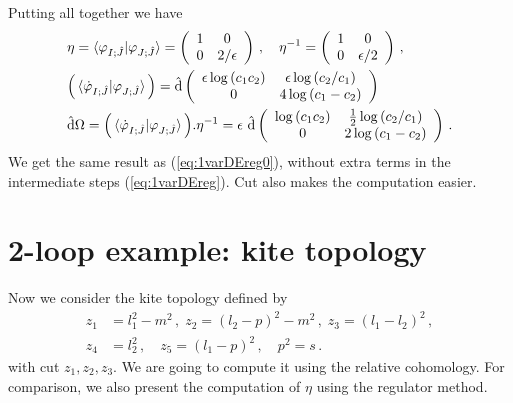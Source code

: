 \documentclass[a4paper,11pt]{article}
\newcommand{\nn}{\nonumber}
\newcommand{\nds}{\hat{\mathrm{d}}}
\newcommand{\ep}{\epsilon}
\def\eref#1{(\ref{#1})}
\begin{document}
Putting all together we have  
\begin{align}
&\eta=\braket{ \varphi_{I;\hat{J}}|\varphi_{J;\hat{J}}} =\left(
\begin{array}{cc}
 1 & 0 \\
 0 & 2/\epsilon  \\
\end{array}
\right)  \, , \quad  \eta^{-1}=\left(
\begin{array}{cc}
 1  & 0 \\
 0 & \epsilon/2 \\
\end{array}
\right)  \, , \nn\\
&\Big( \braket{\dot{\varphi}_{I;\hat{J}}|\varphi_{J;\hat{J}}} \Big) = \nds \left(
\begin{array}{cc}
\ep \log \left(c_1 c_2\right) 
& \ep \log \left(c_2/c_1\right) \\
0 
& 4 \log
   \left(c_1-c_2\right) \\
\end{array}
\right)  \, \nn\\
&\nds \Omega =\Big( \braket{\dot{\varphi}_{I;\hat{J}}|\varphi_{J;\hat{J}}} \Big).\eta^{-1}= \ep~  \nds \left(
\begin{array}{cc}
 \log \left(c_1 c_2\right) & \frac{1}{2} \log \left(c_2/c_1\right) \\
 0 & 2  \log
   \left(c_1-c_2\right) \\
\end{array}
\right)  \, .
\end{align}
We get the same result as \eref{eq:1varDEreg0}, without extra terms in the intermediate steps \eref{eq:1varDEreg}. Cut also makes the computation easier.



\section{2-loop example: kite topology}\label{sec:eg2}

Now we consider the kite topology defined by
\begin{align}
    z_1&=l_1^2-m^2 \,,\; z_2=(l_2-p)^2-m^2 \,,\; z_3=(l_1-l_2)^2 \,,\nn
    \\
    z_4&=l_2^2 \,,\quad z_5=(l_1-p)^2 \,,\quad p^2=s \,.
\end{align}
with cut $z_1, z_2, z_3$.  We are going to compute it using the relative cohomology. For comparison, we also 
present the computation of $\eta$ using the regulator method. 
\end{document}

